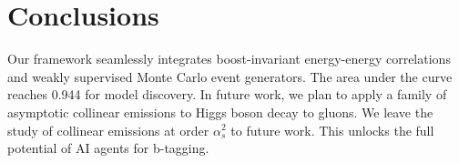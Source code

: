 \section{Conclusions}\label{sec:conclusions}

Our framework seamlessly integrates boost-invariant energy-energy
correlations and weakly supervised Monte Carlo event generators. The
area under the curve reaches 0.944 for model discovery. In future work,
we plan to apply a family of asymptotic collinear emissions to Higgs
boson decay to gluons. We leave the study of collinear emissions at
order $\alpha_s^2$ to future work. This unlocks the full potential of AI
agents for b-tagging.


